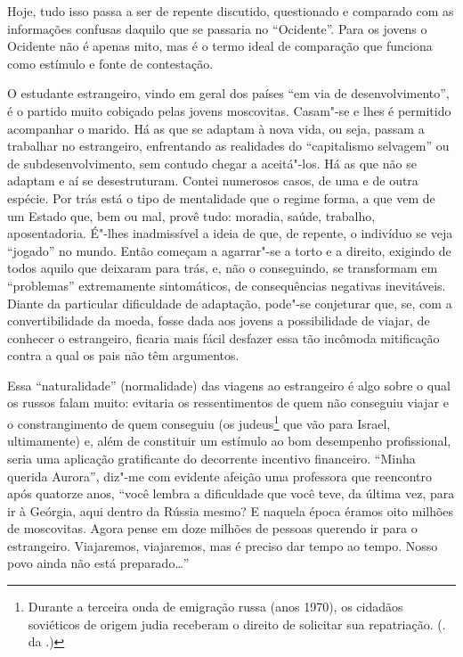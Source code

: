 Hoje, tudo isso passa a ser de repente discutido, questionado e comparado com as informações confusas daquilo que se passaria no ``Ocidente''. Para os jovens o Ocidente não é apenas mito, mas é o termo ideal de comparação que funciona como estímulo e fonte de contestação.

O estudante estrangeiro, vindo em geral dos países ``em via de desenvolvimento'', é o partido muito cobiçado pelas jovens moscovitas. Casam"-se e lhes é permitido acompanhar o marido. Há as que se adaptam à nova vida, ou seja, passam a trabalhar no estrangeiro, enfrentando as realidades do ``capitalismo selvagem'' ou de subdesenvolvimento, sem contudo chegar a aceitá"-los. Há as que não se adaptam e aí se desestruturam. Contei numerosos casos, de uma e de outra espécie. Por trás está o tipo de mentalidade que o regime forma, a que vem de um Estado que, bem ou mal, provê tudo: moradia, saúde, trabalho, aposentadoria. É"-lhes inadmissível a ideia de que, de repente, o indivíduo se veja ``jogado'' no mundo. Então começam a agarrar"-se a torto e a direito, exigindo de todos aquilo que deixaram para trás, e, não o conseguindo, se transformam em ``problemas'' extremamente sintomáticos, de consequências negativas inevitáveis. Diante da particular dificuldade de adaptação, pode"-se conjeturar que, se, com a convertibilidade da moeda, fosse dada aos jovens a possibilidade de viajar, de conhecer o estrangeiro, ficaria mais fácil desfazer essa tão incômoda mitificação contra a qual os pais não têm argumentos.

Essa ``naturalidade'' (normalidade) das viagens ao estrangeiro é algo sobre o qual os russos falam muito: evitaria os ressentimentos de quem não conseguiu viajar e o constrangimento de quem conseguiu (os judeus\footnote{Durante a terceira onda de emigração russa (anos 1970), os cidadãos soviéticos de origem judia receberam o direito de solicitar sua repatriação. (. da .)} que vão para Israel, ultimamente) e, além de constituir um estímulo ao bom desempenho profissional, seria uma aplicação gratificante do decorrente incentivo financeiro. ``Minha querida Aurora'', diz"-me com evidente afeição uma professora que reencontro após quatorze anos, ``você lembra a dificuldade que você teve, da última vez, para ir à Geórgia, aqui dentro da Rússia mesmo? E naquela época éramos oito milhões de moscovitas. Agora pense em doze milhões de pessoas querendo ir para o estrangeiro. Viajaremos, viajaremos, mas é preciso dar tempo ao tempo. Nosso povo ainda não está preparado\ldots{}''

